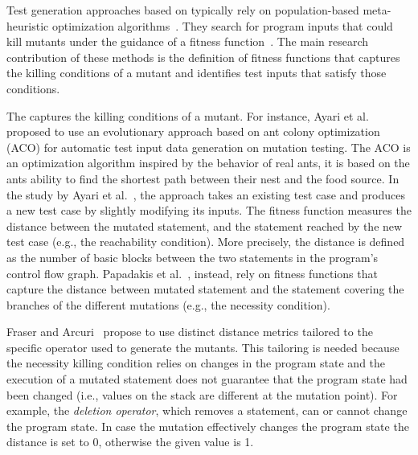 Test generation approaches based on  typically rely on population-based meta-heuristic optimization algorithms~\cite{harman2011strong}. 
They search for program inputs that could kill mutants under the guidance of a fitness function~\cite{harman2011strong}. 
The main research contribution of these methods is the definition of fitness functions that captures the killing conditions of a mutant and identifies test inputs that satisfy those conditions.

The  captures the killing conditions of a mutant. For instance, Ayari et al.~\cite{ayari2007automatic} proposed to use an evolutionary approach based on ant colony optimization (ACO) for automatic test input data generation on mutation testing. The ACO is an optimization algorithm inspired by the behavior of real ants, it is based on the ants ability to find the shortest path between their nest and the food source. In the study by Ayari et al.~\cite{ayari2007automatic}, the approach takes an existing test case and produces a new test case by slightly modifying its inputs. 
The fitness function measures the distance between the mutated statement, and the statement reached by the new test case (e.g., the reachability condition). More precisely, the distance is defined as the number of basic blocks between the two statements in the program's control flow graph.
Papadakis et al.~\cite{papadakis2011automatically}, instead, rely on fitness functions that capture the distance between mutated statement and the statement covering the branches of the different mutations (e.g., the necessity condition).

Fraser and Arcuri~\cite{fraser2015achieving} propose to use distinct distance metrics tailored to the specific operator used to generate the mutants.
This tailoring is needed because the necessity killing condition relies on changes in the program state and the execution of a mutated statement does not guarantee that the program state had been changed (i.e., values on the stack are different at the mutation point).
For example, the \textit{deletion operator}, which removes a statement, can or cannot change the program state. In case the mutation effectively changes the program state the distance is set to 0, otherwise the given value is 1.

